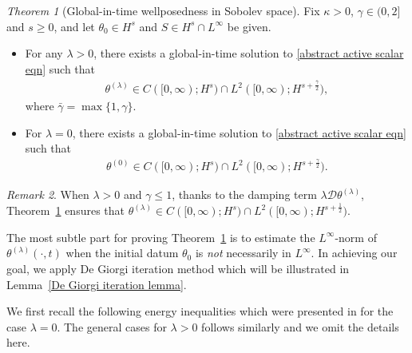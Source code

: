 \documentclass[reqno]{amsart}%
\theoremstyle{definition}
\theoremstyle{remark}
\numberwithin{equation}{section}
\newtheorem{theorem}{Theorem}
\newtheorem{remark}[theorem]{Remark}
\newcommand{\thetalambda}{\theta^{(\lambda)}}
\newcommand{\1}{\mathbf{1}}
\numberwithin{equation}{section}
\numberwithin{theorem}{section}
\numberwithin{figure}{section}
\begin{document}
\begin{theorem}[Global-in-time wellposedness in Sobolev space]\label{global-in-time wellposedness in Sobolev}
Fix $\kappa>0$, $\gamma\in(0,2]$ and $s\ge0$, and let $\theta_0\in H^s$ and $S\in H^s\cap L^\infty$ be given. 
\begin{itemize}
\item For any $\lambda>0$, there exists a global-in-time solution to \eqref{abstract active scalar eqn} such that 
\begin{align}\label{functional spaces for theta}
\thetalambda\in C([0,\infty);H^s)\cap L^2([0,\infty);H^{s+\frac{\bar{\gamma}}{2}}),
\end{align}
where $\bar\gamma=\max\{1,\gamma\}$.
\item For $\lambda=0$, there exists a global-in-time solution to \eqref{abstract active scalar eqn} such that 
\begin{align}\label{functional spaces for theta lambda=0}
\theta^{(0)}\in C([0,\infty);H^s)\cap L^2([0,\infty);H^{s+\frac{\gamma}{2}}).
\end{align}
\end{itemize}
\end{theorem}
\begin{remark}
When $\lambda>0$ and $\gamma\le1$, thanks to the damping term $\lambda\mathcal{D}\thetalambda$, Theorem~\ref{global-in-time wellposedness in Sobolev} ensures that $\thetalambda\in C([0,\infty);H^s)\cap L^2([0,\infty);H^{s+\frac{1}{2}})$.
\end{remark}
The most subtle part for proving Theorem~\ref{global-in-time wellposedness in Sobolev} is to estimate the $L^\infty$-norm of $\theta^{(\lambda)}(\cdot,t)$ when the initial datum $\theta_0$ is {\it not} necessarily in $L^\infty$. In achieving our goal, we apply De Giorgi iteration method which will be illustrated in Lemma~\ref{De Giorgi iteration lemma}. 

We first recall the following energy inequalities which were presented in \cite{FS21} for the case $\lambda=0$. The general cases for $\lambda>0$ follows similarly and we omit the details here.
\end{document}
